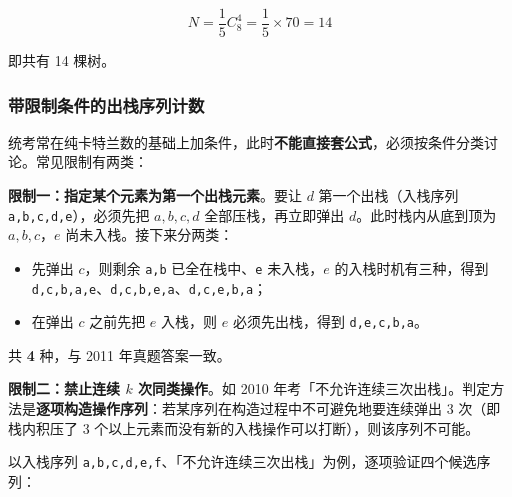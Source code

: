 \documentclass[11pt,openany,UTF8]{ctexbook}
\begin{document}
\[N = \frac{1}{5}C_{8}^{4} = \frac{1}{5} \times 70 = 14\]

即共有 14 棵树。

\subsubsection{带限制条件的出栈序列计数}

统考常在纯卡特兰数的基础上加条件，此时\textbf{不能直接套公式}，必须按条件分类讨论。常见限制有两类：

\textbf{限制一：指定某个元素为第一个出栈元素}。要让 $d$ 第一个出栈（入栈序列 \texttt{a,\allowbreak{}b,\allowbreak{}c,\allowbreak{}d,\allowbreak{}e}），必须先把 $a,b,c,d$ 全部压栈，再立即弹出 $d$。此时栈内从底到顶为 $a,b,c$，$e$ 尚未入栈。接下来分两类：

\begin{itemize}
\item 先弹出 $c$，则剩余 \texttt{a,\allowbreak{}b} 已全在栈中、\texttt{e} 未入栈，$e$ 的入栈时机有三种，得到 \texttt{d,\allowbreak{}c,\allowbreak{}b,\allowbreak{}a,\allowbreak{}e}、\texttt{d,\allowbreak{}c,\allowbreak{}b,\allowbreak{}e,\allowbreak{}a}、\texttt{d,\allowbreak{}c,\allowbreak{}e,\allowbreak{}b,\allowbreak{}a}；
\item 在弹出 $c$ 之前先把 $e$ 入栈，则 $e$ 必须先出栈，得到 \texttt{d,\allowbreak{}e,\allowbreak{}c,\allowbreak{}b,\allowbreak{}a}。
\end{itemize}
共 \textbf{4} 种，与 2011 年真题答案一致。

\textbf{限制二：禁止连续 $k$ 次同类操作}。如 2010 年考「不允许连续三次出栈」。判定方法是\textbf{逐项构造操作序列}：若某序列在构造过程中不可避免地要连续弹出 3 次（即栈内积压了 3 个以上元素而没有新的入栈操作可以打断），则该序列不可能。

以入栈序列 \texttt{a,\allowbreak{}b,\allowbreak{}c,\allowbreak{}d,\allowbreak{}e,\allowbreak{}f}、「不允许连续三次出栈」为例，逐项验证四个候选序列：
\end{document}
